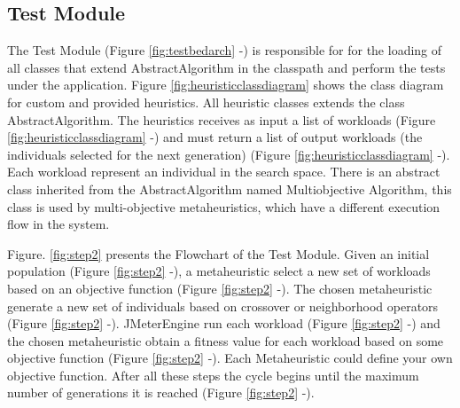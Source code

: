 \documentclass[espaco=umemeio,chapter=TITLE,twoside,openright]{abnt}
\begin{document}
\subsection{Test Module}

The Test Module (Figure \ref{fig:testbedarch}  -) is responsible for for the loading of all classes that extend AbstractAlgorithm in the classpath and perform the tests under the application. Figure \ref{fig:heuristicclassdiagram} shows the  class diagram for custom and provided heuristics. All heuristic classes extends the class AbstractAlgorithm. The heuristics receives  as input a  list of workloads (Figure \ref{fig:heuristicclassdiagram}  -) and must return a list of output workloads (the individuals selected for the next generation)  (Figure \ref{fig:heuristicclassdiagram}  -). Each workload represent an individual in the search space. There is an abstract class inherited from the AbstractAlgorithm named Multiobjective Algorithm, this class is used by multi-objective metaheuristics, which have a different execution flow in the system.

Figure. \ref{fig:step2} presents the Flowchart of the Test Module. Given an initial population (Figure \ref{fig:step2}  -),  a metaheuristic select a new set of workloads based on an objective function (Figure \ref{fig:step2}  -). The chosen metaheuristic generate a new set of individuals based on crossover or neighborhood operators (Figure \ref{fig:step2}  -).  JMeterEngine run each workload (Figure \ref{fig:step2}  -) and the chosen metaheuristic obtain a fitness value for each workload based on some objective function  (Figure \ref{fig:step2}  -). Each Metaheuristic could define your own objective function. After all these steps the cycle begins until the maximum number of generations it is reached (Figure \ref{fig:step2}  -).
\end{document}
